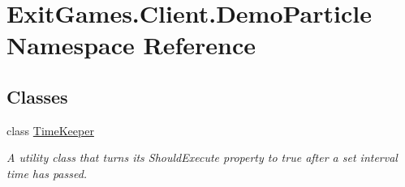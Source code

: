 \hypertarget{namespace_exit_games_1_1_client_1_1_demo_particle}{}\section{Exit\+Games.\+Client.\+Demo\+Particle Namespace Reference}
\label{namespace_exit_games_1_1_client_1_1_demo_particle}
\subsection*{Classes}
\begin{DoxyCompactItemize}
\item 
class \hyperlink{class_exit_games_1_1_client_1_1_demo_particle_1_1_time_keeper}{Time\+Keeper}
\begin{DoxyCompactList}\small\item\em A utility class that turns it\textquotesingle{}s Should\+Execute property to true after a set interval time has passed. \end{DoxyCompactList}\end{DoxyCompactItemize}
